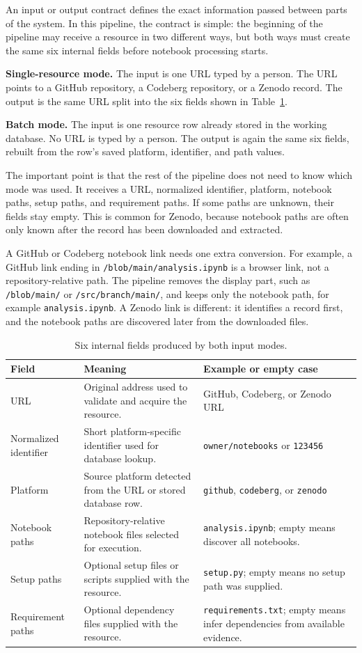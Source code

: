 An input or output contract defines the exact information passed between parts of the system. In this pipeline, the contract is simple: the beginning of the pipeline may receive a resource in two different ways, but both ways must create the same six internal fields before notebook processing starts.

\noindent\textbf{Single-resource mode.} The input is one URL typed by a person. The URL points to a GitHub repository, a Codeberg repository, or a Zenodo record. The output is the same URL split into the six fields shown in Table~\ref{tab:io-contract}.

\noindent\textbf{Batch mode.} The input is one resource row already stored in the working database. No URL is typed by a person. The output is again the same six fields, rebuilt from the row's saved platform, identifier, and path values.

The important point is that the rest of the pipeline does not need to know which mode was used. It receives a URL, normalized identifier, platform, notebook paths, setup paths, and requirement paths. If some paths are unknown, their fields stay empty. This is common for Zenodo, because notebook paths are often only known after the record has been downloaded and extracted.

A GitHub or Codeberg notebook link needs one extra conversion. For example, a GitHub link ending in \texttt{/blob/main/analysis.ipynb} is a browser link, not a repository-relative path. The pipeline removes the display part, such as \texttt{/blob/main/} or \texttt{/src/branch/main/}, and keeps only the notebook path, for example \texttt{analysis.ipynb}. A Zenodo link is different: it identifies a record first, and the notebook paths are discovered later from the downloaded files.

\begin{table}[H]
\centering
\caption{Six internal fields produced by both input modes.}
\label{tab:io-contract}
\small
\begin{tabularx}{\textwidth}{@{}>{\raggedright\arraybackslash}p{3.2cm}>{\raggedright\arraybackslash}X>{\raggedright\arraybackslash}p{4.1cm}@{}}
\toprule
Field & Meaning & Example or empty case\tabularnewline
\midrule
URL & Original address used to validate and acquire the resource. & GitHub, Codeberg, or Zenodo URL\tabularnewline
Normalized identifier & Short platform-specific identifier used for database lookup. & \texttt{owner/notebooks} or \texttt{123456}\tabularnewline
Platform & Source platform detected from the URL or stored database row. & \texttt{github}, \texttt{codeberg}, or \texttt{zenodo}\tabularnewline
Notebook paths & Repository-relative notebook files selected for execution. & \texttt{analysis.ipynb}; empty means discover all notebooks.\tabularnewline
Setup paths & Optional setup files or scripts supplied with the resource. & \texttt{setup.py}; empty means no setup path was supplied.\tabularnewline
Requirement paths & Optional dependency files supplied with the resource. & \texttt{requirements.txt}; empty means infer dependencies from available evidence.\tabularnewline
\bottomrule
\end{tabularx}
\end{table}


